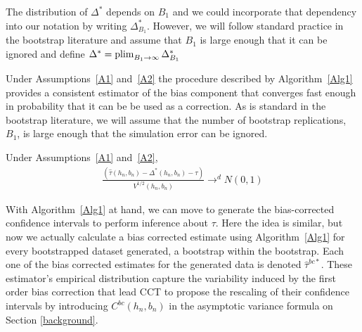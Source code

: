 \documentclass[12pt,fleqn]{article}
\begin{document}
The distribution of $\Delta^{*}$ depends on $B_{1}$ and we could
incorporate that dependency into our notation by writing $\Delta^*_{B_1}$. However, we will follow standard practice in the bootstrap
literature and assume that $B_{1}$ is large enough that it can be ignored and define $\Delta^* = \operatorname*{plim}_{B_{1} \to \infty} \Delta^*_{B_{1}}$

Under Assumptions~\ref{A1} and~\ref{A2} the procedure described by
Algorithm~\ref{Alg1} provides a consistent estimator of the bias component that
converges fast enough in probability that it can be be used as a correction. As is standard in the bootstrap literature, we will assume
that the number of bootstrap replications, $B_{1}$, is large enough that the simulation error can be ignored.

\begin{theorem}\label{T1}
  Under Assumptions~\ref{A1} and~\ref{A2},
\begin{align}
  \frac{(\hat\tau(h_{n},b_{n}) - \Delta^{*}(h_{n},b_{n}) - \tau)}{ V^{1/2}(h_n, b_n)} \to^{d} N(0,1)
\end{align}
\end{theorem}

With Algorithm~\ref{Alg1} at hand, we can move to generate the bias-corrected confidence intervals to perform inference about $\tau$. Here the idea is similar, but now we actually calculate a bias corrected estimate using Algorithm~\ref{Alg1} for every bootstrapped dataset generated, a bootstrap within the bootstrap. Each one of the bias corrected estimates for the generated data is denoted $\hat{\tau}^{bc*}$. These estimator's empirical distribution capture the variability induced by the first order bias correction that lead CCT to propose the rescaling of their confidence intervals by introducing $C^{bc}(h_{n},b_{n})$ in the asymptotic variance formula on Section \ref{background}.
\end{document}
